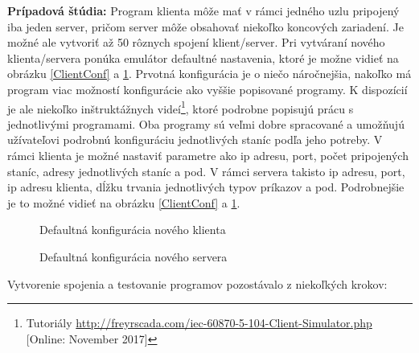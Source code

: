 \noindent \textbf{Prípadová štúdia:} Program klienta môže mať v rámci jedného uzlu pripojený iba jeden server, pričom server môže obsahovať niekoľko koncových zariadení. Je možné ale vytvoriť až 50 rôznych spojení klient/server. Pri vytváraní nového klienta/servera ponúka emulátor defaultné nastavenia, ktoré je možne vidieť na obrázku \ref{ClientConf} a \ref{ServerConf}. Prvotná konfigurácia je o niečo náročnejšia, nakoľko má program viac možností konfigurácie ako vyššie popisované programy. K dispozícií je ale niekoľko inštruktážnych videí\footnote{Tutoriály \url{http://freyrscada.com/iec-60870-5-104-Client-Simulator.php} [Online: November 2017]}, ktoré podrobne popisujú prácu s jednotlivými programami. Oba programy sú veľmi dobre spracované a umožňujú užívateľovi podrobnú konfiguráciu jednotlivých staníc podľa jeho potreby. V rámci klienta je možné nastaviť parametre ako ip adresu, port, počet pripojených staníc, adresy jednotlivých staníc a pod. V rámci servera takisto ip adresu, port, ip adresu klienta, dĺžku trvania jednotlivých typov príkazov a pod. Podrobnejšie je to možné vidieť na obrázku \ref{ClientConf} a \ref{ServerConf}.
\begin{figure}[h]
    \centering
    \begin{minipage}[b]{0.4\textwidth}
    \centering
    \caption{Defaultná konfigurácia nového klienta}
    \label{ClientConf}
    \end{minipage}
    \begin{minipage}[b]{0.4\textwidth}
    \centering
    \caption{Defaultná konfigurácia nového servera}
    \label{ServerConf}
    \end{minipage}
\end{figure} \par
Vytvorenie spojenia a testovanie programov pozostávalo z niekoľkých krokov:
